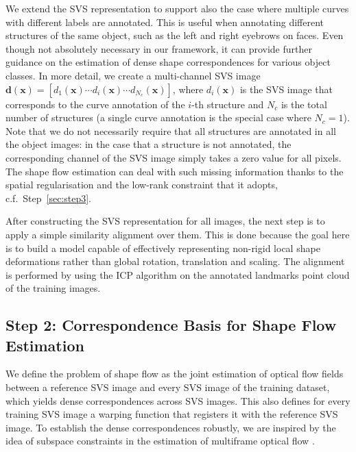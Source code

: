 
We extend the SVS representation to support also the case where multiple curves with different labels are annotated. This is useful when annotating different structures of the same object, such as the left and right eyebrows on faces. Even though not absolutely necessary in our framework, it can provide further guidance on the estimation of dense shape correspondences for various object classes. In more detail, we create a multi-channel SVS image $\bm{d}(\bm{x})=[d_1(\bm{x}) \cdots d_i(\bm{x}) \cdots d_{N_c}(\bm{x})]$, where $d_i(\bm{x})$ is the SVS image that corresponds to the curve annotation of the $i$-th structure and $N_c$ is the total number of structures (a single curve annotation is the special case where $N_c=1$). Note that we do not necessarily require that all structures are annotated in all the object images: in the case that a structure is not annotated, the corresponding channel of the SVS image simply takes a zero value for all pixels. The shape flow estimation can deal with such missing information thanks to the spatial regularisation and the low-rank constraint that it adopts, c.f.~Step~\ref{sec:step3}.

After constructing the SVS representation for all images, the next step is to apply a simple similarity alignment over them. This is done because the goal here is to build a model capable of effectively representing non-rigid local shape deformations rather than global rotation, translation and scaling. The alignment is performed by using the ICP algorithm \cite{Besl1992} on the annotated landmarks point cloud of the training images.


{\label{sec:step2}\subsection*{Step 2: Correspondence Basis for Shape Flow Estimation}}

We define the problem of shape flow as the joint estimation of optical flow fields between a reference SVS image and every SVS image of the training dataset, which yields dense correspondences across SVS images. This also defines for every training SVS image a warping function that registers it with the reference SVS image. To establish the dense correspondences robustly, we are inspired by the idea of subspace constraints in the estimation of multiframe optical flow \cite{Garg:2013hu,tomasi2012dense,snape15faceflow}.

